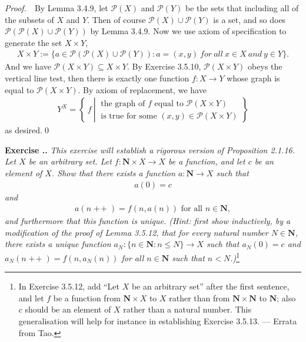 \documentclass{book}
\DeclareMathOperator{\tadd}{+\!+}%
\newcommand{\pff}{\vspace{.25em}\noindent\emph{Proof.}~~}
\newcounter{Exercise}[section]
\renewcommand{\theExercise}{\thesection.\arabic{Exercise}.}
\newcommand{\new}{\vspace{1.5em}\noindent\textbf{{Exercise \stepcounter{Exercise}\textbf{\theExercise}}} }
\begin{document}
\pff By Lemma 3.4.9, let $\mathcal{P}(X)$ and $\mathcal{P}(Y)$ be the sets that including all of the subsets of $X$ and $Y$. Then of course $\mathcal{P}(X)\cup\mathcal{P}(Y)$ is a set, and so does $\mathcal{P}(\mathcal{P}(X)\cup\mathcal{P}(Y))$ by Lemma 3.4.9. Now we use axiom of specification to generate the set $X\times Y$,
    \begin{align*}
        X\times Y:=\{a\in\mathcal{P}(\mathcal{P}(X)\cup\mathcal{P}(Y)):a=(x,y)\ for\ all\ x\in X\ and\  y\in Y\}.
    \end{align*}
And we have $\mathcal{P}(X\times Y)\subseteq X\times Y$. By Exercise 3.5.10, $\mathcal{P}(X\times Y)$ obeys the vertical line test, then there is exactly one function $f:X\to Y$ whose graph is equal to $\mathcal{P}(X\times Y)$. By axiom of replacement, we have
    \begin{align*}
        Y^X=\left\{\ f\ \left|\ \begin{array}{l}
            \text{the graph of }f\text{ equal to }\mathcal{P}(X\times Y)\\
            \text{is true for some }(x,y)\in\mathcal{P}(X\times Y)
        \end{array}\right.
        \right\}
    \end{align*}
as desired.\qed

\new\emph{This exercise will establish a rigorous version of Proposition 2.1.16. Let $X$ be an arbitrary set. Let $f:\mathbf{N}\times X\to X$ be a function, and let $c$ be an element of $X$. Show that there exists a function $a:\mathbf{N}\to X$ such that}
    \begin{align*}
        a(0)=c
    \end{align*}
\emph{and}
    \begin{align*}
        a(n\tadd)=f(n,a(n))\text{ for all }n\in\mathbf{N},
    \end{align*}
\emph{and furthermore that this function is unique. (Hint: first show inductively, by a modification of the proof of Lemma 3.5.12, that for every natural number $N\in\mathbf{N}$, there exists a unique function $a_N:\{n\in\mathbf{N}:n\leq N\}\to X$ such that $a_N(0)=c$ and $a_N(n\tadd)=f(n,a_N(n))$ for all $n\in\mathbf{N}$ such that $n<N$.)}\footnote{In Exercise 3.5.12, add ``Let $X$ be an arbitrary set'' after the first sentence, and let $f$ be a function from ${\mathbf N} \times X$ to $X$ rather than from ${\mathbf N} \times {\mathbf N}$ to ${\mathbf N}$; also $c$ should be an element of $X$ rather than a natural number. This generalisation will help for instance in establishing Exercise 3.5.13. --- Errata from Tao.}
\end{document}
